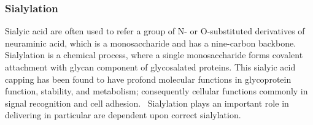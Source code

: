 \subsubsection {Sialylation}
Sialyic acid are often used to refer a group of N- or O-substituted derivatives of neuraminic acid, which is a monosaccharide and has a nine-carbon backbone.~\cite{Vocadlo_2009} Sialylation is a chemical process, where a single monosaccharide forms covalent attachment with glycan component of glycosalated proteins. This sialyic acid capping has been found to have profond molecular functions in glycoprotein function, stability, and metabolism; consequently  cellular functions commonly in signal recognition and cell adhesion.~\cite{Bhide_2016} Sialylation plays an important role in delivering in particular are dependent upon correct sialylation.